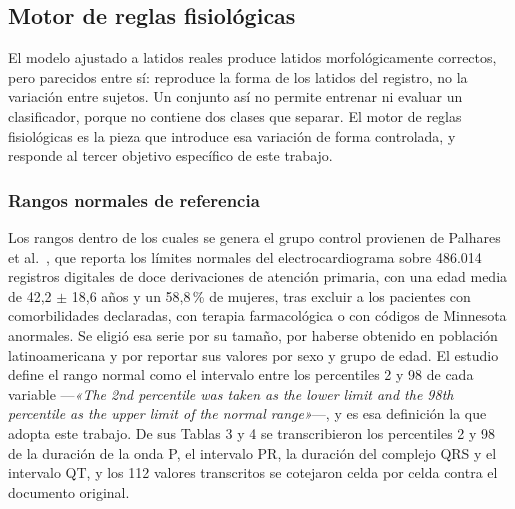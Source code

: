 \begin{spacing}{1.5}
\begin{table}[H]
\centering
{}
\caption{Restricciones de caja del ajuste. La línea base se acota a $\pm1{,}5$ desviaciones estándar en su desnivel y a $\pm3$ en su pendiente, por unidad de tiempo normalizado de la ventana.}
\label{tab:cotas}
\end{table}

\subsection{Motor de reglas fisiológicas}\label{sec:reglas}

El modelo ajustado a latidos reales produce latidos morfológicamente correctos, pero parecidos entre sí: reproduce la forma de los latidos del registro, no la variación entre sujetos. Un conjunto así no permite entrenar ni evaluar un clasificador, porque no contiene dos clases que separar. El motor de reglas fisiológicas es la pieza que introduce esa variación de forma controlada, y responde al tercer objetivo específico de este trabajo.

\subsubsection{Rangos normales de referencia}

Los rangos dentro de los cuales se genera el grupo control provienen de Palhares et al.\ \cite{palhares2017normal}, que reporta los límites normales del electrocardiograma sobre 486.014 registros digitales de doce derivaciones de atención primaria, con una edad media de 42,2 $\pm$ 18,6 años y un 58,8\,\% de mujeres, tras excluir a los pacientes con comorbilidades declaradas, con terapia farmacológica o con códigos de Minnesota anormales. Se eligió esa serie por su tamaño, por haberse obtenido en población latinoamericana y por reportar sus valores por sexo y grupo de edad. El estudio define el rango normal como el intervalo entre los percentiles 2 y 98 de cada variable —\emph{«The 2nd percentile was taken as the lower limit and the 98th percentile as the upper limit of the normal range»}—, y es esa definición la que adopta este trabajo. De sus Tablas 3 y 4 se transcribieron los percentiles 2 y 98 de la duración de la onda P, el intervalo PR, la duración del complejo QRS y el intervalo QT, y los 112 valores transcritos se cotejaron celda por celda contra el documento original.


\end{spacing}
